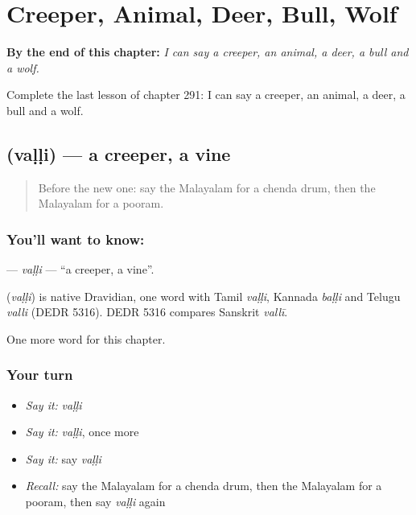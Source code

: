 
\chapter{Creeper, Animal, Deer, Bull, Wolf}
\label{ch:ml-creeper-animal-deer-bull-wolf}

\begin{chapteropening}
\textbf{By the end of this chapter:} \emph{I can say a creeper, an animal, a deer, a bull and a wolf.}

Complete the last lesson of chapter 291: I can say a creeper, an animal, a deer, a bull and a wolf.
\end{chapteropening}

\section[\texorpdfstring{\ml{വള്ളി} (vaḷḷi)}{വള്ളി (vaḷḷi)}]{ (vaḷḷi) — a creeper, a vine}

\label{lesson:ML-C291-valli}



\begin{quote}
Before the new one: say the Malayalam for a chenda drum, then the Malayalam for a pooram.
\end{quote}

\subsection*{You'll want to know: }
\textbf{} — \emph{vaḷḷi} — \textquotedblleft{}a creeper, a vine\textquotedblright{}.

\begin{cousinweb}
\textbf{} (\emph{vaḷḷi}) is native Dravidian, one word with Tamil \emph{vaḷḷi}, Kannada \emph{baḷḷi} and Telugu \emph{valli} (DEDR 5316). DEDR 5316 compares Sanskrit \emph{vallī}.
\end{cousinweb}

\begin{grammarlens}[title={What you've built}]
One more word for this chapter.
\end{grammarlens}

\subsection*{Your turn}
\begin{itemize}
\raggedright
  \item \emph{Say it:} \emph{vaḷḷi}
  \item \emph{Say it:} \emph{vaḷḷi}, once more
  \item \emph{Say it:} say \emph{vaḷḷi}
  \item \emph{Recall:} say the Malayalam for a chenda drum, then the Malayalam for a pooram, then say \emph{vaḷḷi} again
\end{itemize}

